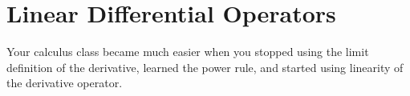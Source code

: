 %
%


\section{Linear Differential Operators}

Your calculus class became much easier when you stopped using the limit definition of the derivative,  learned the power rule, and started using linearity of the derivative operator.

